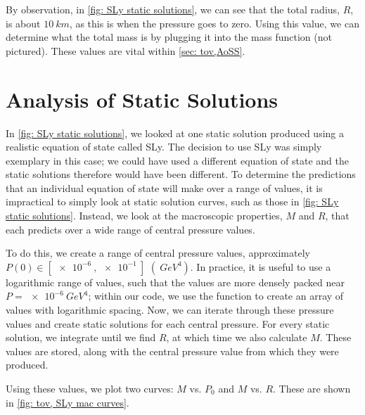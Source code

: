 By observation, in \autoref{fig: SLy static solutions}, we can see that the total radius, $R$, is about $\SI{10}{km}$, as this is when the pressure goes to zero. Using this value, we can determine what the total mass is by plugging it into the mass function (not pictured). These values are vital within \autoref{sec: tov,AoSS}.

\section{Analysis of Static Solutions}\label{sec: tov,AoSS}


In \autoref{fig: SLy static solutions}, we looked at one static solution produced using a realistic equation of state called SLy. The decision to use SLy was simply exemplary in this case; we could have used a different equation of state and the static solutions therefore would have been different. To determine the predictions that an individual equation of state will make over a range of values, it is impractical to simply look at static solution curves, such as those in \autoref{fig: SLy static solutions}. Instead, we look at the macroscopic properties, $M$ and $R$, that each predicts over a wide range of central pressure values.

To do this, we create a range of central pressure values, approximately $P(0)\in [\SI{e-6}{}, \SI{e-1}{}]$ $(\SI{}{GeV^4})$. In practice, it is useful to use a logarithmic range of values, such that the values are more densely packed near $P=\SI{e-6}{GeV^4}$; within our code, we use the  function  to create an array of values with logarithmic spacing. Now, we can iterate through these pressure values and create static solutions for each central pressure. For every static solution, we integrate until we find $R$, at which time we also calculate $M$. These values are stored, along with the central pressure value from which they were produced.

Using these values, we plot two curves: $M$ vs. $P_0$ and $M$ vs. $R$. These are shown in \autoref{fig: tov, SLy mac curves}.

